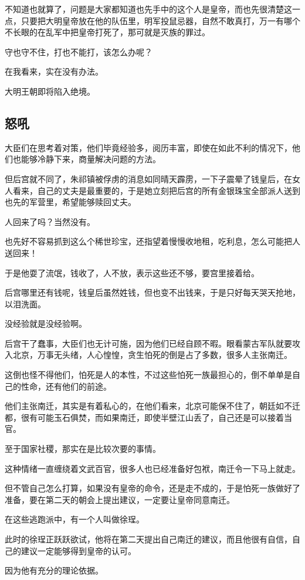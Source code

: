 \begin{multicols}{\theparacolNo}
不知道也就算了，问题是大家都知道也先手中的这个人是皇帝，而也先很清楚这一点，只要把大明皇帝放在他的队伍里，明军投鼠忌器，自然不敢真打，万一有哪个不长眼的在乱军中把皇帝打死了，那可就是灭族的罪过。

守也守不住，打也不能打，该怎么办呢？

在我看来，实在没有办法。

大明王朝即将陷入绝境。

\subsection{怒吼}
大臣们在思考着对策，他们毕竟经验多，阅历丰富，即使在如此不利的情况下，他们也能够冷静下来，商量解决问题的方法。

但后宫就不同了，朱祁镇被俘虏的消息如同晴天霹雳，一下子震晕了钱皇后，在女人看来，自己的丈夫是最重要的，于是她立刻把后宫的所有金银珠宝全部派人送到也先的军营里，希望能够赎回丈夫。

人回来了吗？当然没有。

也先好不容易抓到这么个稀世珍宝，还指望着慢慢收地租，吃利息，怎么可能把人送回来！

于是他耍了流氓，钱收了，人不放，表示这些还不够，要宫里接着给。

后宫哪里还有钱呢，钱皇后虽然姓钱，但也变不出钱来，于是只好每天哭天抢地，以泪洗面。

没经验就是没经验啊。

后宫干了蠢事，大臣们也无计可施，因为他们已经自顾不暇。眼看蒙古军队就要攻入北京，万事无头绪，人心惶惶，贪生怕死的倒是占了多数，很多人主张南迁。

这倒也怪不得他们，怕死是人的本性，不过这些怕死一族最担心的，倒不单单是自己的性命，还有他们的前途。

他们主张南迁，其实是有着私心的，在他们看来，北京可能保不住了，朝廷如不迁都，很有可能玉石俱焚，而如果南迁，即使半壁江山丢了，自己还是可以接着当官。

至于国家社稷，那实在是比较次要的事情。

这种情绪一直缠绕着文武百官，很多人也已经准备好包袱，南迁令一下马上就走。

但不管自己怎么打算，如果没有皇帝的命令，还是走不成的，于是怕死一族做好了准备，要在第二天的朝会上提出建议，一定要让皇帝同意南迁。

在这些逃跑派中，有一个人叫做徐珵。

此时的徐珵正跃跃欲试，他将在第二天提出自己南迁的建议，而且他很有自信，自己的建议一定能够得到皇帝的认可。

因为他有充分的理论依据。


\end{multicols}

